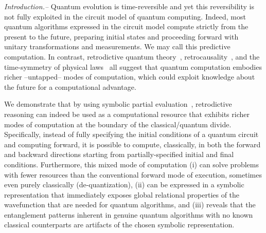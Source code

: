 \documentclass[aps,prl,twocolumn,superscriptaddress,floatfix,notitlepage]{revtex4-2}
\begin{document}
{\it Introduction.--} Quantum evolution is time-reversible and yet this reversibility 
is not fully exploited in the circuit model of quantum
computing. Indeed, most quantum algorithms expressed in the circuit
model compute strictly from the present to the future, preparing
initial states and proceeding forward with unitary transformations and
measurements. We may call this predictive computation. In contrast, retrodictive quantum
theory~\cite{sym13040586}, retrocausality~\cite{Aharonov2008}, and the
time-symmetry of physical laws~\cite{RevModPhys.27.179} all suggest
that quantum computation embodies richer --untapped-- modes of
computation, which could exploit knowledge about the future for a
computational advantage.

We demonstrate that by using symbolic partial
evaluation~\cite{futamura}, retrodictive reasoning can indeed be used
as a computational resource that exhibits richer modes of computation
at the boundary of the classical/quantum divide. Specifically, instead
of fully specifying the initial conditions of a quantum circuit and
computing forward, it is possible to compute, classically, in both the
forward and backward directions starting from partially-specified
initial and final conditions. Furthermore, this mixed mode of
computation (i) can solve problems with fewer resources than the
conventional forward mode of execution, sometimes even purely
classically (de-quantization), (ii) can be expressed in a symbolic
representation that immediately exposes global relational properties
of the wavefunction that are needed for quantum algorithms, and (iii)
reveals that the entanglement patterns inherent in genuine quantum
algorithms with no known classical counterparts are artifacts of the
chosen symbolic representation.
\end{document}
